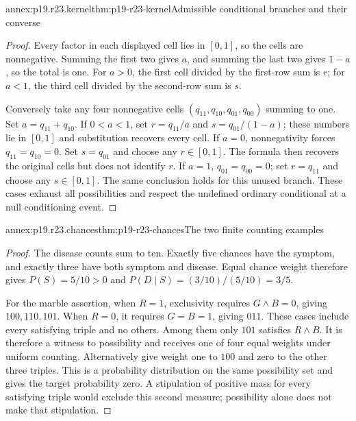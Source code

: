 \begin{annexitem}{annex:p19.r23.kernel}{thm:p19-r23-kernel}{Admissible conditional branches and their converse}
\begin{proof}
Every factor in each displayed cell lies in \([0,1]\), so the cells
are nonnegative. Summing the first two gives \(a\), and summing the
last two gives \(1-a\), so the total is one. For \(a>0\),
the first cell divided by the first-row sum is \(r\); for \(a<1\),
the third cell divided by the second-row sum is \(s\).

Conversely take any four nonnegative cells
\((q_{11},q_{10},q_{01},q_{00})\) summing to one. Set
\(a=q_{11}+q_{10}\). If \(0<a<1\), set
\(r=q_{11}/a\) and \(s=q_{01}/(1-a)\); these numbers lie in
\([0,1]\) and substitution recovers every cell. If \(a=0\),
nonnegativity forces \(q_{11}=q_{10}=0\). Set \(s=q_{01}\)
and choose any \(r\in[0,1]\). The formula then recovers the
original cells but does not identify \(r\). If \(a=1\),
\(q_{01}=q_{00}=0\); set \(r=q_{11}\) and choose any
\(s\in[0,1]\). The same conclusion holds for this unused branch.
These cases exhaust all possibilities and respect the undefined ordinary
conditional at a null conditioning event.
\end{proof}
\end{annexitem}

\begin{annexitem}{annex:p19.r23.chances}{thm:p19-r23-chances}{The two finite counting examples}
\begin{proof}
The disease counts sum to ten. Exactly five chances have the symptom,
and exactly three have both symptom and disease. Equal chance weight
therefore gives \(P(S)=5/10>0\) and
\(P(D\mid S)=(3/10)/(5/10)=3/5\).

For the marble assertion, when \(R=1\), exclusivity requires
\(G\land B=0\), giving \(100,110,101\). When \(R=0\),
it requires \(G=B=1\), giving \(011\). These cases include
every satisfying triple and no others. Among them only \(101\)
satisfies \(R\land B\). It is therefore a witness to possibility
and receives one of four equal weights under uniform counting.
Alternatively give weight one to \(100\) and zero to the other
three triples. This is a probability distribution on the same
possibility set and gives the target probability zero. A stipulation
of positive mass for every satisfying triple would exclude this
second measure; possibility alone does not make that stipulation.
\end{proof}
\end{annexitem}

